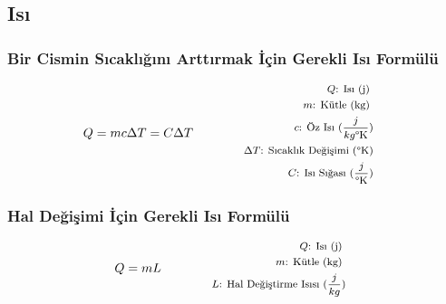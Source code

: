 \subsection{Isı}

\subsubsection*{Bir Cismin Sıcaklığını Arttırmak İçin Gerekli Isı Formülü}
\begin{equation}
    Q = mc\Delta T = C\Delta T \qquad \qquad \parbox{4cm}{\footnotesize$\begin{aligned}
        Q\text{: Isı (j) }  \\
        m\text{: Kütle (kg) } \\
        c\text{: Öz Isı } (\frac{j}{kg\text{\textdegree K}}) \\
        \Delta T \text{: Sıcaklık Değişimi (\textdegree K)} \\
        C\text{: Isı Sığası } (\frac{j}{\text{\textdegree K}})
\end{aligned}$}
\end{equation}

\subsubsection*{Hal Değişimi İçin Gerekli Isı Formülü}
\begin{equation}
    Q = mL \qquad \qquad \parbox{4cm}{\footnotesize$\begin{aligned}
        Q\text{: Isı (j) }  \\
        m\text{: Kütle (kg) } \\
        L\text{: Hal Değiştirme Isısı } (\frac{j}{kg})
\end{aligned}$}
\end{equation}
